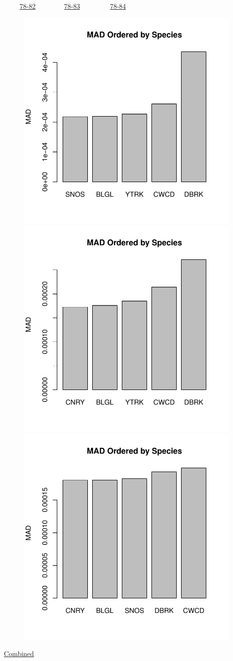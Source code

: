 \documentclass[ xcolor = pdftex, dvipsnames, table ]{beamer}
\begin{document}
\begin{frame}{$~~~~~~~~~$ \href{https://github.com/gasduster99/sppComp/tree/master/sscRuns/25319781982M4}{78-82} $~~~~~~~~~~~~~~~~$ \href{https://github.com/gasduster99/sppComp/tree/master/sscRuns/25319781983M4}{78-83} $~~~~~~~~~~~~~~~~~$ \href{https://github.com/gasduster99/sppComp/tree/master/sscRuns/25319781984M4}{78-84} }
        \begin{figure}[ht!]
        \centering
        \hspace*{-1cm}
        \includegraphics[width=.4\textwidth]{../sscRuns/25319781982M4/sppTailMad68.pdf}
        \includegraphics[width=.4\textwidth]{../sscRuns/25319781983M4/sppTailMad68.pdf}
        \includegraphics[width=.4\textwidth]{../sscRuns/25319781984M4/sppTailMad68.pdf}
        \end{figure}
	\vspace{-1cm}
	\begin{center}
	\Large
	\href{https://github.com/gasduster99/sppComp/tree/master/try1/postSSC/25319781982345M4}{Combined}
	\end{center}
\end{frame}
\end{document}

